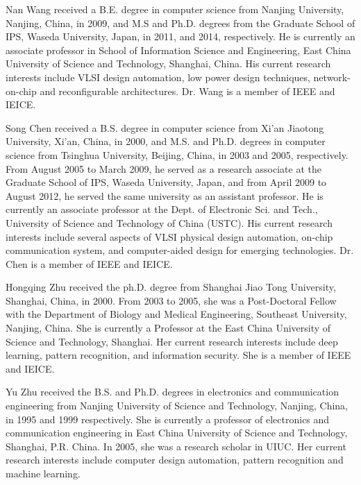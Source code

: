 \documentclass[10pt,journal]{IEEEtran}
\begin{document}
\begin{IEEEbiography}{Nan Wang}
received a B.E. degree in computer science from Nanjing University, Nanjing, China, in 2009, and M.S and Ph.D. degrees from the Graduate School of IPS, Waseda University, Japan, in 2011, and 2014, respectively. He is currently an associate professor in School of Information Science and Engineering, East China University of Science and Technology, Shanghai, China. His current research interests include VLSI design automation, low power design techniques, network-on-chip and reconfigurable architectures. Dr. Wang is a member of IEEE and IEICE.
\end{IEEEbiography}

\begin{IEEEbiography}{Song Chen}
received a B.S. degree in computer science from Xi'an Jiaotong University, Xi'an, China, in 2000, and M.S. and Ph.D. degrees in computer science from Tsinghua University, Beijing, China, in 2003 and 2005, respectively. From August 2005 to March 2009, he served as a research associate at the Graduate School of IPS, Waseda University, Japan, and from April 2009 to August 2012, he served the same university as an assistant professor. He is currently an associate professor at the Dept. of Electronic Sci. and Tech., University of Science and Technology of China (USTC). His current research interests include several aspects of VLSI physical design automation, on-chip communication system, and computer-aided design for emerging technologies. Dr. Chen is a member of IEEE and IEICE.
\end{IEEEbiography}

\begin{IEEEbiography}{Hongqing Zhu}
received the ph.D. degree from Shanghai Jiao Tong University, Shanghai, China, in 2000. From 2003 to 2005, she was a Post-Doctoral Fellow with the Department of Biology and Medical Engineering, Southeast University, Nanjing, China. She is currently a Professor at the East China University of Science and Technology, Shanghai. Her current research interests include deep learning, pattern recognition, and information security. She is a member of IEEE and IEICE.
\end{IEEEbiography}

\begin{IEEEbiography}{Yu Zhu}
received the B.S. and Ph.D. degrees in electronics and communication engineering from Nanjing University of Science and Technology, Nanjing, China, in 1995 and 1999 respectively. She is currently a professor of electronics and communication engineering in East China University of Science and Technology, Shanghai, P.R. China. In 2005, she was a research scholar in UIUC. Her current research interests include computer design automation, pattern recognition and machine learning.
\end{IEEEbiography}
\end{document}
